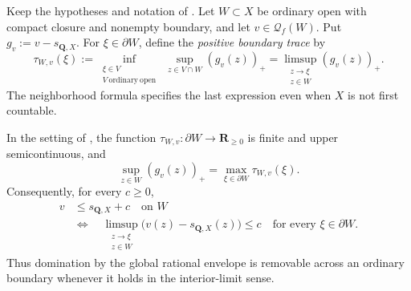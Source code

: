 
\begin{definition}
\label{def:p031-rational-defect-boundary-trace}
Keep the hypotheses and notation of
.  Let $W\subset X$ be ordinary
open with compact closure and nonempty boundary, and let
$v\in\mathcal Q_f(W)$.  Put $g_v:=v-s_{\mathbf Q,X}$.  For
$\xi\in\partial W$, define the \emph{positive boundary trace} by
\begin{equation}
\label{eq:p031-rational-defect-boundary-trace}
 \tau_{W,v}(\xi)
  :=\inf_{\substack{\xi\in V\\ V\ \mathrm{ordinary\ open}}}
       \ \sup_{z\in V\cap W}(g_v(z))_+
   =\limsup_{\substack{z\to\xi\\ z\in W}}(g_v(z))_+.
\end{equation}
The neighborhood formula specifies the last expression even when $X$ is
not first countable.
\end{definition}

\begin{theorem}
\label{thm:p031-rational-defect-boundary-trace}
In the setting of
, the function
$\tau_{W,v}:\partial W\to\mathbf R_{\geq0}$ is finite and upper
semicontinuous, and
\begin{equation}
\label{eq:p031-rational-defect-boundary-trace-maximum}
       \sup_{z\in W}(g_v(z))_+
             =\max_{\xi\in\partial W}\tau_{W,v}(\xi).
\end{equation}
Consequently, for every $c\geq0$,
\begin{equation}
\label{eq:p031-rational-defect-asymptotic-comparison}
 \begin{split}
 v&\leq s_{\mathbf Q,X}+c\quad\text{on }W\\
 &\Longleftrightarrow\quad
 \limsup_{\substack{z\to\xi\\ z\in W}}
       \bigl(v(z)-s_{\mathbf Q,X}(z)\bigr)\leq c
       \quad\text{for every }\xi\in\partial W.
 \end{split}
\end{equation}
Thus domination by the global rational envelope is removable across an
ordinary boundary whenever it holds in the interior-limit sense.
\end{theorem}

